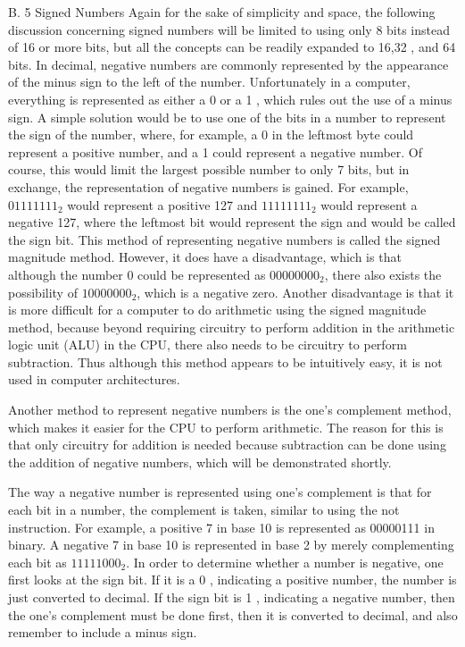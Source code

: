 \documentclass[10pt]{book}
\begin{document}
B. 5 Signed Numbers
Again for the sake of simplicity and space, the following discussion concerning signed numbers will be limited to using only 8 bits instead of 16 or more bits, but all the concepts can be readily expanded to 16,32 , and 64 bits. In decimal, negative numbers are commonly represented by the appearance of the minus sign to the left of the number. Unfortunately in a computer, everything is represented as either a 0 or a 1 , which rules out the use of a minus sign. A simple solution would be to use one of the bits in a number to represent the sign of the number, where, for example, a 0 in the leftmost byte could represent a positive number, and a 1 could represent a negative number. Of course, this would limit the largest possible number to only 7 bits, but in exchange, the representation of negative numbers is gained. For example, $01111111_{2}$ would represent a positive 127 and $11111111_{2}$ would represent a negative 127, where the leftmost bit would represent the sign and would be called the sign bit. This method of representing negative numbers is called the signed magnitude method. However, it does have a disadvantage, which is that\\
although the number 0 could be represented as $00000000_{2}$, there also exists the possibility of $10000000_{2}$, which is a negative zero. Another disadvantage is that it is more difficult for a computer to do arithmetic using the signed magnitude method, because beyond requiring circuitry to perform addition in the arithmetic logic unit (ALU) in the CPU, there also needs to be circuitry to perform subtraction. Thus although this method appears to be intuitively easy, it is not used in computer architectures.

Another method to represent negative numbers is the one's complement method, which makes it easier for the CPU to perform arithmetic. The reason for this is that only circuitry for addition is needed because subtraction can be done using the addition of negative numbers, which will be demonstrated shortly.

The way a negative number is represented using one's complement is that for each bit in a number, the complement is taken, similar to using the not instruction. For example, a positive 7 in base 10 is represented as 00000111 in binary. A negative 7 in base 10 is represented in base 2 by merely complementing each bit as $11111000_{2}$. In order to determine whether a number is negative, one first looks at the sign bit. If it is a 0 , indicating a positive number, the number is just converted to decimal. If the sign bit is 1 , indicating a negative number, then the one's complement must be done first, then it is converted to decimal, and also remember to include a minus sign.
\end{document}
